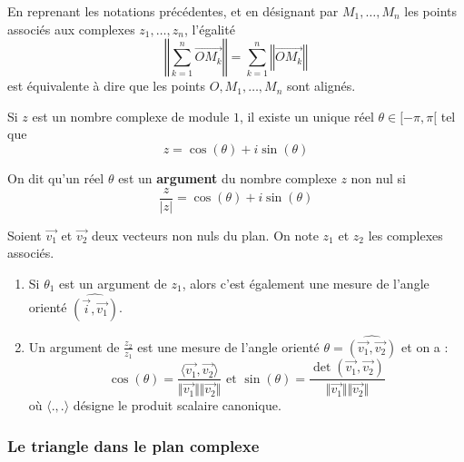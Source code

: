   \begin{remark}
    En reprenant les notations précédentes, et en désignant par $M_1, \dots, M_n$ les points associés aux complexes $z_1, \dots, z_n$, l'égalité
    \[ \left\Vert \sum_{k=1}^n \overrightarrow{OM_k} \right\Vert = \sum_{k=1}^n \left\Vert \overrightarrow{OM_k} \right\Vert \]
    est équivalente à dire que les points $O, M_1, \dots, M_n$ sont alignés.
  \end{remark}

  \begin{theorem}
    Si $z$ est un nombre complexe de module $1$, il existe un unique réel $\theta \in [-\pi, \pi[$ tel que
    \[ z = \cos(\theta) + i\sin(\theta) \]
  \end{theorem}

  \begin{definition}
    On dit qu'un réel $\theta$ est un \textbf{argument} du nombre complexe $z$ non nul si
    \[ \frac{z}{\vert z \vert} = \cos(\theta) + i\sin(\theta) \]
  \end{definition}

  \begin{theorem}
    Soient $\overrightarrow{v_1}$ et $\overrightarrow{v_2}$ deux vecteurs non nuls du plan. On note $z_1$ et $z_2$ les complexes associés.
    \begin{enumerate}[label={\bfseries(\roman*)}]
      \item Si $\theta_1$ est un argument de $z_1$, alors c'est également une mesure de l'angle orienté $\widehat{(\overrightarrow{i}, \overrightarrow{v_1})}$.
      \item Un argument de $\frac{z_2}{z_1}$ est une mesure de l'angle orienté $\theta = \widehat{(\overrightarrow{v_1}, \overrightarrow{v_2})}$ et on a :
      \[ \cos(\theta) = \frac{\langle \overrightarrow{v_1}, \overrightarrow{v_2} \rangle}{\Vert \overrightarrow{v_1} \Vert \Vert \overrightarrow{v_2} \Vert} \text{ et } \sin(\theta) = \frac{\det \left( \overrightarrow{v_1}, \overrightarrow{v_2} \right)}{\Vert \overrightarrow{v_1} \Vert \Vert \overrightarrow{v_2} \Vert} \]
      où $\langle ., . \rangle$ désigne le produit scalaire canonique.
    \end{enumerate}
  \end{theorem}

  \subsubsection{Le triangle dans le plan complexe}


